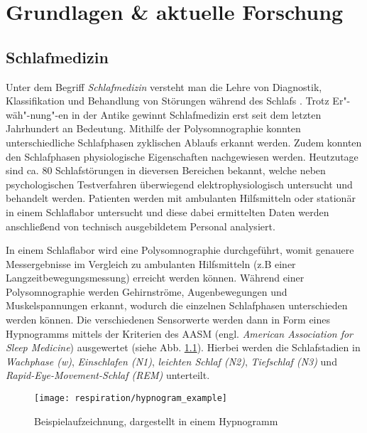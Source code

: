 
\chapter{Grundlagen \& aktuelle Forschung}
\label{ch:Basics}

\section{Schlafmedizin}
\label{ch:Basics:se:schlafmedizin}
Unter dem Begriff \textit{Schlafmedizin} versteht man die Lehre von Diagnostik, Klassifikation und Behandlung von Störungen während des Schlafs \cite{croenleinSchlafmedizin1x1Praxisorientiertes2017}. 
Trotz Er"-wäh"-nung"-en in der Antike gewinnt Schlafmedizin erst seit dem letzten Jahrhundert an Bedeutung.
Mithilfe der Polysomnographie konnten unterschiedliche Schlafphasen zyklischen Ablaufs erkannt werden.
Zudem konnten den Schlafphasen physiologische Eigenschaften nachgewiesen werden.
Heutzutage sind ca. 80 Schlafstörungen in dieversen Bereichen bekannt, welche neben psychologischen Testverfahren überwiegend elektrophysiologisch untersucht und behandelt werden.
Patienten werden mit ambulanten Hilfsmitteln oder stationär in einem Schlaflabor untersucht und diese dabei ermittelten Daten werden anschließend von technisch ausgebildetem Personal analysiert.

In einem Schlaflabor wird eine Polysomnographie durchgeführt, womit genauere Messergebnisse im Vergleich zu ambulanten Hilfsmitteln (z.B einer Langzeitbewegungsmessung) erreicht werden können.
Während einer Polysomnographie werden Gehirnströme, Augenbewegungen und Muskelspannungen erkannt, wodurch die einzelnen Schlafphasen unterschieden werden können.
Die verschiedenen Sensorwerte werden dann in Form eines Hypnogramms mittels der Kriterien des AASM (engl. \textit{American Association for Sleep Medicine}) ausgewertet (siehe Abb. \ref{hypnogram_example}). 
Hierbei werden die Schlafstadien in \textit{Wachphase (w)}, \textit{Einschlafen (N1)}, \textit{leichten Schlaf (N2)}, \textit{Tiefschlaf (N3)} und \textit{Rapid-Eye-Movement-Schlaf (REM)} unterteilt.

\begin{figure}[ht]
    \centering
    \texttt{[image: respiration/hypnogram\_example]}
    \caption{Beispielaufzeichnung, dargestellt in einem Hypnogramm \cite{stuckPraxisSchlafmedizinDiagnostik2018}}
    \label{hypnogram_example}
\end{figure}

